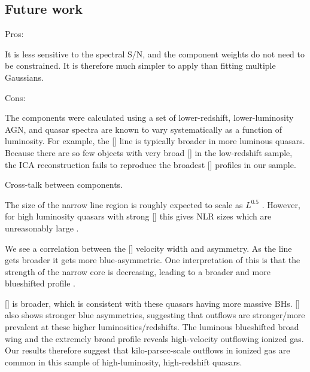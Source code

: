\subsection{Future work}

Pros:

It is less sensitive to the spectral S/N, and the component weights do not need to be constrained. 
It is therefore much simpler to apply than fitting multiple Gaussians. 

Cons:

The components were calculated using a set of lower-redshift, lower-luminosity AGN, and quasar spectra are known to vary systematically as a function of luminosity. 
For example, the [] line is typically broader in more luminous quasars. 
Because there are so few objects with very broad [] in the low-redshift sample, the ICA reconstruction fails to reproduce the broadest [] profiles in our sample. 

Cross-talk between components. 






The size of the narrow line region is roughly expected to scale as $L^{0.5}$ \citep[e.g.][]{netzer04}. 
However, for high luminosity quasars with strong [] this gives NLR sizes which are unreasonably large \citep[$\sim$100 kpc;][]{netzer04}. 




We see a correlation between the [] velocity width and asymmetry. 
As the line gets broader it gets more blue-asymmetric. 
One interpretation of this is that the strength of the narrow core is decreasing, leading to a broader and more blueshifted profile \citep[e.g.][]{shen14}. 


[] is broader, which is consistent with these quasars having more massive BHs. 
[] also shows stronger blue asymmetries, suggesting that outflows are stronger/more prevalent at these higher luminosities/redshifts. 
The luminous blueshifted broad wing and the extremely broad profile reveals high-velocity outflowing ionized gas. 
Our results therefore suggest that kilo-parsec-scale outflows in ionized gas are common in this sample of high-luminosity, high-redshift quasars.



